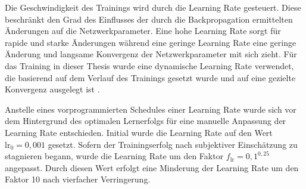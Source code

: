 Die Geschwindigkeit des Trainings wird durch die Learning Rate gesteuert. Diese beschränkt den Grad des Einflusses der durch die Backpropagation ermittelten Änderungen auf die Netzwerkparameter. Eine hohe Learning Rate sorgt für rapide und starke Änderungen während eine geringe Learning Rate eine geringe Änderung und langsame Konvergenz der Netzwerkparameter mit sich zieht. Für das Training in dieser Thesis wurde eine dynamische Learning Rate verwendet, die basierend auf dem Verlauf des Trainings gesetzt wurde und auf eine gezielte Konvergenz ausgelegt ist \cite{adaptive_lr_schedule}.

Anstelle eines vorprogrammierten Schedules einer Learning Rate wurde sich vor dem Hintergrund des optimalen Lernerfolgs für eine manuelle Anpassung der Learning Rate entschieden. Initial wurde die Learning Rate auf den Wert $\text{lr}_0 = 0,001$ gesetzt. Sofern der Trainingserfolg nach subjektiver Einschätzung zu stagnieren begann, wurde die Learning Rate um den Faktor $f_\text{lr} = 0,1^{0,25}$ angepasst. Durch diesen Wert erfolgt eine Minderung der Learning Rate um den Faktor 10 nach vierfacher Verringerung.



